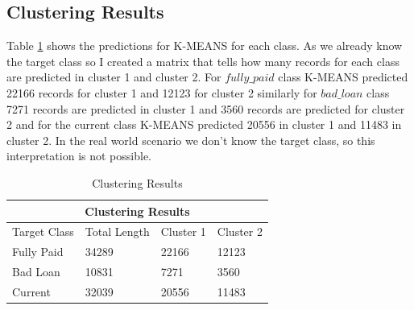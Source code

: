 \documentclass[12pt]{article}
\begin{document}
\subsection{Clustering Results}
Table \ref{table:clustering_results} shows the predictions for K-MEANS for each class. As we already know the target class so I created a matrix that tells how many records for each class are predicted in cluster 1 and cluster 2.
For $fully\_paid$ class K-MEANS predicted 22166 records for cluster 1 and 12123 for cluster 2 similarly for $bad\_loan$ class 7271 records are predicted in cluster 1 and 3560 records are predicted for cluster 2 and for the current class K-MEANS predicted 20556 in cluster 1 and 11483 in cluster 2. In the real world scenario we don't know the target class, so this interpretation is not possible.
\begin{table}[h!]
	\centering
	\begin{tabular}{ |p{2cm}|p{2cm}|p{2cm}|p{2cm}|  }
		\hline
		\multicolumn{4}{|c|}{Clustering Results} \\
		\hline
		Target Class & Total Length & Cluster 1 & Cluster 2 \\
		\hline
		 Fully Paid & 34289  & 22166 & 12123\\
		Bad Loan & 10831 & 7271 & 3560\\
		Current & 32039 & 20556 & 11483\\
		\hline
	\end{tabular}
	\caption{Clustering Results}
	\label{table:clustering_results}
\end{table}
\end{document}
